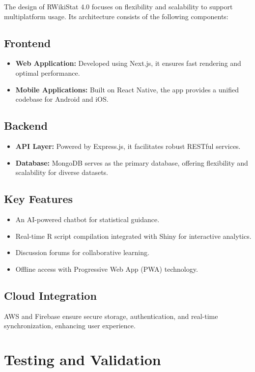 \documentclass[conference,a4paper]{IEEEtran}
\begin{document}
The design of RWikiStat 4.0 focuses on flexibility and scalability to support
multiplatform usage. Its architecture consists of the following components:

\subsection{Frontend}
\begin{itemize}
  \item \textbf{Web Application:} Developed using Next.js, it ensures fast rendering and optimal performance.
  \item \textbf{Mobile Applications:} Built on React Native, the app provides a unified codebase for Android and iOS.
\end{itemize}

\subsection{Backend}
\begin{itemize}
  \item \textbf{API Layer:} Powered by Express.js, it facilitates robust RESTful services.
  \item \textbf{Database:} MongoDB serves as the primary database, offering flexibility and scalability for diverse datasets.
\end{itemize}

\subsection{Key Features}
\begin{itemize}
  \item An AI-powered chatbot for statistical guidance.
  \item Real-time R script compilation integrated with Shiny for interactive analytics.
  \item Discussion forums for collaborative learning.
  \item Offline access with Progressive Web App (PWA) technology.
\end{itemize}

\subsection{Cloud Integration}
AWS and Firebase ensure secure storage, authentication, and real-time
synchronization, enhancing user experience.

\section{Testing and Validation}
\label{sect:testing_validation}
\end{document}
